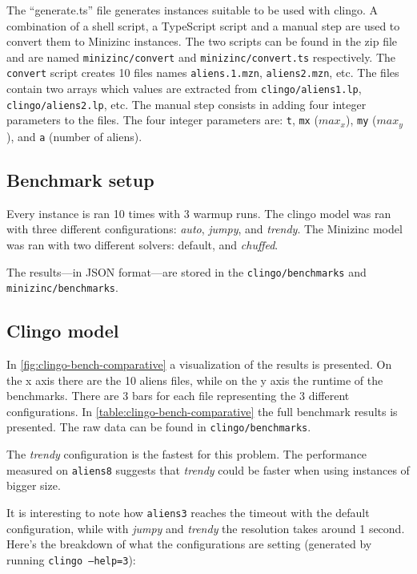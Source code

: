 \documentclass[11pt]{article}
\begin{document}
The ``generate.ts'' file generates instances suitable to be used with clingo.
A combination of a shell script, a TypeScript script and a manual step are used to convert them to Minizinc instances.
The two scripts can be found in the zip file and are named \texttt{minizinc/convert} and \texttt{minizinc/convert.ts} respectively.
The \texttt{convert} script creates 10 files names \texttt{aliens.1.mzn}, \texttt{aliens2.mzn}, etc.
The files contain two arrays which values are extracted from \texttt{clingo/aliens1.lp}, \texttt{clingo/aliens2.lp}, etc.
The manual step consists in adding four integer parameters to the files.
The four integer parameters are: \texttt{t}, \texttt{mx} ($max_x$), \texttt{my} ($max_y$), and \texttt{a} (number of aliens).

\subsection{Benchmark setup}

Every instance is ran 10 times with 3 warmup runs.
The clingo model was ran with three different configurations: \textit{auto}, \textit{jumpy}, and \textit{trendy}.
The Minizinc model was ran with two different solvers: default, and \textit{chuffed}.

The results---in JSON format---are stored in the \texttt{clingo/benchmarks} and \texttt{minizinc/benchmarks}.

\subsection{Clingo model}

In \autoref{fig:clingo-bench-comparative} a visualization of the results is presented.
On the x axis there are the 10 aliens files, while on the y axis the runtime of the benchmarks.
There are 3 bars for each file representing the 3 different configurations.
In \autoref{table:clingo-bench-comparative} the full benchmark results is presented.
The raw data can be found in \texttt{clingo/benchmarks}.

The \textit{trendy} configuration is the fastest for this problem.
The performance measured on \texttt{aliens8} suggests that \textit{trendy} could be faster when using instances of bigger size.

It is interesting to note how \texttt{aliens3} reaches the timeout with the default configuration, while with \textit{jumpy} and \textit{trendy} the resolution takes around 1 second. Here's the breakdown of what the configurations are setting (generated by running \texttt{clingo --help=3}):
\end{document}
